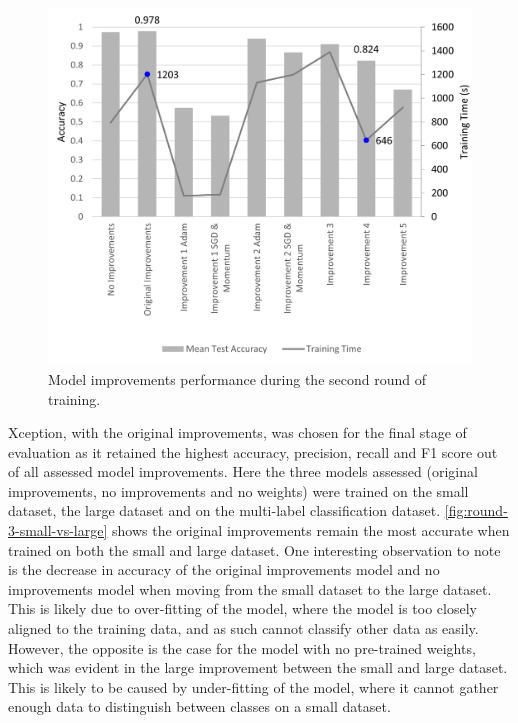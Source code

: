 \begin{figure}[H]
    \centering
    \includegraphics[width=\textwidth]{figures/round-2-accuracy-training.png}
    \caption{Model improvements performance during the second round of training.}
    \label{fig:round-2-accuracy-training}
\end{figure}

Xception, with the original improvements, was chosen for the final stage of evaluation as it retained the highest accuracy, precision, recall and F1 score out of all assessed model improvements. Here the three models assessed (original improvements, no improvements and no weights) were trained on the small dataset, the large dataset and on the multi-label classification dataset. \autoref{fig:round-3-small-vs-large} shows the original improvements remain the most accurate when trained on both the small and large dataset. One interesting observation to note is the decrease in accuracy of the original improvements model and no improvements model when moving from the small dataset to the large dataset. This is likely due to over-fitting of the model, where the model is too closely aligned to the training data, and as such cannot classify other data as easily. However, the opposite is the case for the model with no pre-trained weights, which was evident in the large improvement between the small and large dataset. This is likely to be caused by under-fitting of the model, where it cannot gather enough data to distinguish between classes on a small dataset.

